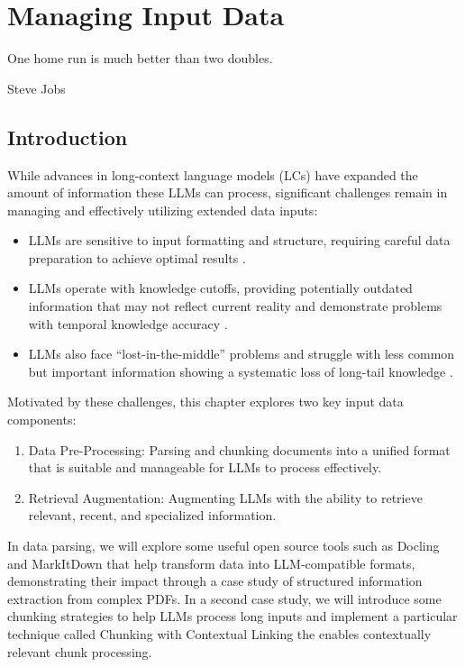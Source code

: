 \setchapterpreamble[u]{\margintoc}
\chapter{Managing Input Data}
\label{chapter:input}

\epigraph{One home run is much better than two doubles.}{Steve Jobs}
\section{Introduction}

While advances in long-context language models (LCs)  have expanded the amount of information these LLMs can process, significant challenges remain in managing and effectively utilizing extended data inputs:

\begin{itemize}
    \item LLMs are sensitive to input formatting and structure, requiring careful data preparation to achieve optimal results .
    \item LLMs operate with knowledge cutoffs, providing potentially outdated information that may not reflect current reality and demonstrate problems with temporal knowledge accuracy .
    \item LLMs also face ``lost-in-the-middle'' problems  and struggle with less common but important information showing a systematic loss of long-tail knowledge .
\end{itemize}

Motivated by these challenges, this chapter explores two key input data components:

\begin{enumerate}
    \item Data Pre-Processing: Parsing and chunking documents into a unified format that is suitable and manageable for LLMs to process effectively.
    \item Retrieval Augmentation: Augmenting LLMs with the ability to retrieve relevant, recent, and specialized information.
\end{enumerate}

In data parsing, we will explore some useful open source tools such as Docling and MarkItDown that help transform data into LLM-compatible formats, demonstrating their impact through a case study of structured information extraction from complex PDFs. In a second case study, we will introduce some chunking strategies to help LLMs process long inputs and implement a particular technique called Chunking with Contextual Linking the enables contextually relevant chunk processing.

